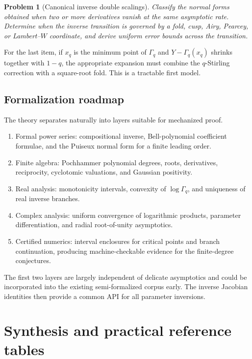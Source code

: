 \documentclass[11pt,a4paper,oneside,openany]{book}
\newtheorem{problem}[theorem]{Problem}
\theoremstyle{definition}
\theoremstyle{remark}
\begin{document}
\begin{problem}[Canonical inverse double scalings]
Classify the normal forms obtained when two or more derivatives vanish at the
same asymptotic rate.  Determine when the inverse transition is governed by
a fold, cusp, Airy, Pearcey, or Lambert--\(W\) coordinate, and derive uniform
error bounds across the transition.
\end{problem}

For the last item, if \(x_q\) is the minimum point of \(\Gamma_q\) and
\(Y-\Gamma_q(x_q)\) shrinks together with \(1-q\), the appropriate expansion
must combine the \(q\)-Stirling correction with a square-root fold.  This is a
tractable first model.

\section{Formalization roadmap}

The theory separates naturally into layers suitable for mechanized proof.

\begin{enumerate}[label=\arabic*.]
\item Formal power series: compositional inverse, Bell-polynomial coefficient
formulae, and the Puiseux normal form for a finite leading order.
\item Finite algebra: Pochhammer polynomial degrees, roots, derivatives,
reciprocity, cyclotomic valuations, and Gaussian positivity.
\item Real analysis: monotonicity intervals, convexity of \(\log\Gamma_q\),
and uniqueness of real inverse branches.
\item Complex analysis: uniform convergence of logarithmic products,
parameter differentiation, and radial root-of-unity asymptotics.
\item Certified numerics: interval enclosures for critical points and branch
continuation, producing machine-checkable evidence for the finite-degree
conjectures.
\end{enumerate}

The first two layers are largely independent of delicate asymptotics and could
be incorporated into the existing semi-formalized corpus early.  The inverse
Jacobian identities then provide a common API for all parameter inversions.

\chapter{Synthesis and practical reference tables}
\end{document}
